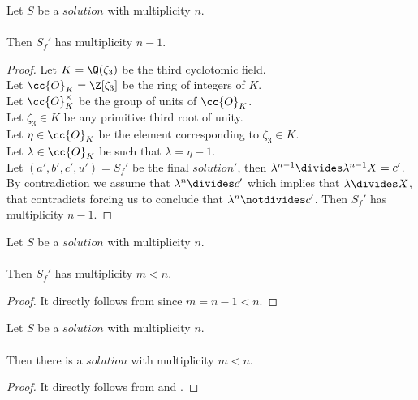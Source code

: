 \begin{lemma}
  \label{lmm:Solution1_final_multiplicity}
  \leanok
  Let $S$ be a $solution$ with multiplicity $n$.\\\\
  Then $S_f'$ has multiplicity $n-1$.
\end{lemma}
\begin{proof}
  \leanok
  Let $K = \Q(\zeta_3)$ be the third cyclotomic field. \\
  Let $\cc{O}_K = \Z[\zeta_3]$ be the ring of integers of $K$. \\
  Let $\cc{O}^\times_K$ be the group of units of $\cc{O}_K$. \\
  Let $\zeta_3 \in K$ be any primitive third root of unity. \\
  Let $\eta \in \cc{O}_K$ be the element corresponding to $\zeta_3 \in K$. \\
  Let $\lambda \in \cc{O}_K$ be such that $\lambda = \eta -1$. \\
  Let $(a',b',c',u') = S_f'$ be the final $solution'$, then
  $\lambda^{n-1} \divides \lambda^{n-1} X = c'$.
  By contradiction we assume that $\lambda^n \divides c'$ which implies that $\lambda \divides X$,
  that contradicts  forcing us to conclude
  that $\lambda^{n} \notdivides c'$. Then $S_f'$ has multiplicity $n-1$.
\end{proof}

\begin{lemma}
  \label{lmm:Solution1_final_multiplicity_lt}
  \leanok
  Let $S$ be a $solution$ with multiplicity $n$.\\\\
  Then $S_f'$ has multiplicity $m<n$.
\end{lemma}
\begin{proof}
  \leanok
  It directly follows from  since $m = n-1 < n$.
\end{proof}

\begin{theorem}
  \label{lmm:exists_Solution_multiplicity_lt}
  \leanok
  Let $S$ be a $solution$ with multiplicity $n$.\\\\
  Then there is a $solution$ with multiplicity $m<n$.
\end{theorem}
\begin{proof}
  \leanok
  It directly follows from  and
  .
\end{proof}


